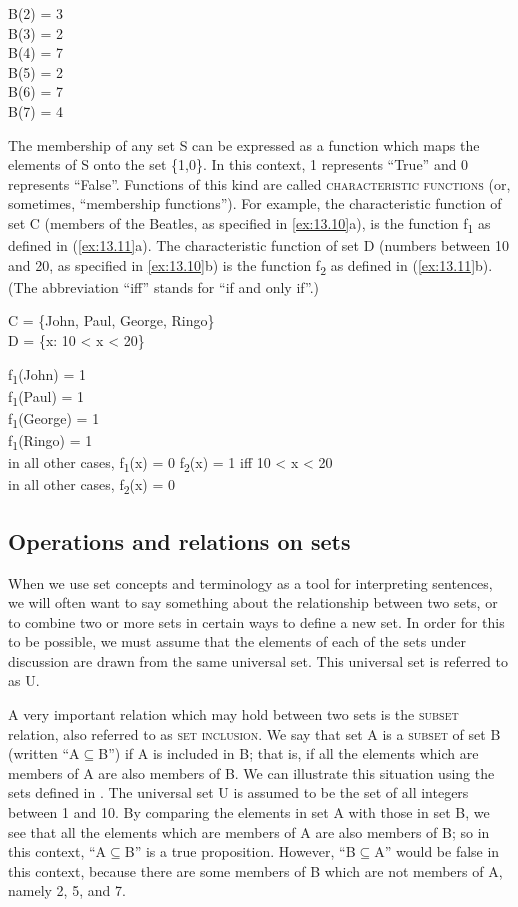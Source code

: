 \ea \label{ex:13.9}
B(2) = 3\\
B(3) = 2\\
B(4) = 7\\
B(5) = 2\\
B(6) = 7\\
B(7) = 4
\z


The membership of any set S can be expressed as a function which maps the elements of S onto the set \{1,0\}. In this context, 1 represents “True” and 0 represents “False”. Functions of this kind are called \textsc{characteristic functions} (or, sometimes, “membership functions”). For example, the characteristic function of set C (members of the Beatles, as specified in \ref{ex:13.10}a), is the function f\textsubscript{1} as defined in (\ref{ex:13.11}a). The characteristic function of set D (numbers between 10 and 20, as specified in \ref{ex:13.10}b) is the function f\textsubscript{2} as defined in (\ref{ex:13.11}b). (The abbreviation “iff” stands for “if and only if”.)


\ea \label{ex:13.10}
\ea  C = \{John, Paul, George, Ringo\}\\
\ex D = \{x: 10 < x < 20\}
                       \z
\z

\ea \label{ex:13.11}
\ea  f\textsubscript{1}(John) = 1\\
f\textsubscript{1}(Paul) = 1\\
f\textsubscript{1}(George) = 1\\
f\textsubscript{1}(Ringo) = 1\\
in all other cases, f\textsubscript{1}(x) = 0
\ex f\textsubscript{2}(x) = 1 iff 10 < x < 20\\
in all other cases, f\textsubscript{2}(x) = 0
\z \z

\subsection{Operations and relations on sets}\label{sec:13.3.2}

When we use set concepts and terminology as a tool for interpreting sentences, we will often want to say something about the relationship between two sets, or to combine two or more sets in certain ways to define a new set. In order for this to be possible, we must assume that the elements of each of the sets under discussion are drawn from the same universal set. This universal set is referred to as U.



A very important relation which may hold between two sets is the \textsc{subset} relation, also referred to as \textsc{set} \textsc{inclusion}. We say that set A is a \textsc{subset} of set B (written “A${\subseteq}$B”) if A is included in B; that is, if all the elements which are members of A are also members of B. We can illustrate this situation using the sets defined in . The universal set U is assumed to be the set of all integers between 1 and 10. By comparing the elements in set A with those in set B, we see that all the elements which are members of A are also members of B; so in this context, “A${\subseteq}$B” is a true proposition. However, “B${\subseteq}$A” would be false in this context, because there are some members of B which are not members of A, namely 2, 5, and 7.


